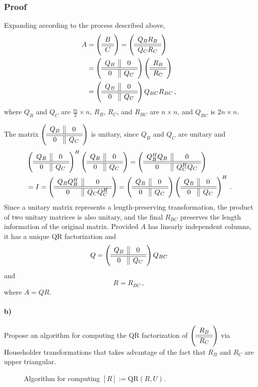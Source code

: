 \documentclass[letterpaper,10pt]{article}
\begin{document}
\subsubsection*{Proof}
Expanding according to the process described above,
\begin{align*}
A&=\left( \begin{array}{c} B \\ \hline\hline C \end{array} \right)=\left( \begin{array}{c} Q_BR_B \\ \hline\hline Q_CR_C \end{array} \right)\\
&=\left( \begin{array}{c || c} Q_B & 0 \\ \hline\hline 0 & Q_C \end{array} \right)\left( \begin{array}{c} R_B \\ \hline\hline R_C \end{array} \right)\\
&=\left( \begin{array}{c || c} Q_B & 0 \\ \hline\hline 0 & Q_C \end{array} \right)Q_{BC}R_{BC}\,,
\end{align*}
where $Q_B$ and $Q_C$ are $\frac{m}{2}\times n$, $R_B$, $R_C$, and $R_{BC}$ are
$n\times n$, and $Q_{BC}$ is $2n\times n$.

The matrix
$
\left( \begin{array}{c || c} Q_B & 0 \\ \hline\hline 0 & Q_C \end{array} \right)
$
is unitary, since $Q_B$ and $Q_C$ are unitary and
\begin{align*}
&\left( \begin{array}{c || c} Q_B & 0 \\ \hline\hline 0 & Q_C \end{array} \right)^H\left( \begin{array}{c || c} Q_B & 0 \\ \hline\hline 0 & Q_C \end{array} \right)
=\left( \begin{array}{c || c} Q_B^HQ_B & 0 \\ \hline\hline 0 & Q_C^HQ_C \end{array} \right)\\
&=I=\left( \begin{array}{c || c} Q_BQ_B^H & 0 \\ \hline\hline 0 & Q_CQ_C^H \end{array} \right)
=\left( \begin{array}{c || c} Q_B & 0 \\ \hline\hline 0 & Q_C \end{array} \right)
\left( \begin{array}{c || c} Q_B & 0 \\ \hline\hline 0 & Q_C \end{array} \right)^H\,.
\end{align*}
Since a unitary matrix represents a length-preserving transformation, the
product of two unitary matrices is also unitary, and the final $R_{BC}$
preserves the length information of the original matrix. Provided $A$ has
linearly independent columns, it has a unique QR factorization and
\[
Q=\left( \begin{array}{c || c} Q_B & 0 \\ \hline\hline 0 & Q_C \end{array} \right)Q_{BC}
\]
and
\[
R=R_{BC}\,,
\]
where $A=QR$.

\paragraph*{b)} Propose an algorithm for computing the QR factorization of $
\left( \begin{array}{c} R_B \\ \hline\hline R_C \end{array} \right)$ via Householder transformations that takes
advantage of the fact that $R_B$ and $R_C$ are upper triangular.

\begin{figure}[tbp]
\begin{center}     %
\FlaAlgorithm      %
\end{center}
\caption{Algorithm for computing
$\left[ R \right] := \mbox{QR}( R, U )$.}
\label{fig:label}
\end{figure}
\end{document}
